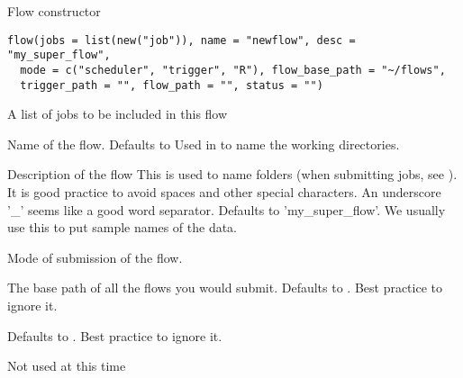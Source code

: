%
\begin{Description}\relax
Flow constructor
\end{Description}
%
\begin{Usage}
\begin{verbatim}
flow(jobs = list(new("job")), name = "newflow", desc = "my_super_flow",
  mode = c("scheduler", "trigger", "R"), flow_base_path = "~/flows",
  trigger_path = "", flow_path = "", status = "")
\end{verbatim}
\end{Usage}
%
\begin{Arguments}
\begin{ldescription}
\item[\code{jobs}]  A list of jobs to be included in this flow

\item[\code{name}]  Name of the flow. Defaults to 
Used in  to name the working directories.

\item[\code{desc}]  Description of the flow
This is used to name folders (when submitting jobs, see ).
It is good practice to avoid spaces and other special characters.
An underscore '\_' seems like a good word separator.
Defaults to 'my\_super\_flow'. We usually use this to put sample names of the data.

\item[\code{mode}]  Mode of submission of the flow.

\item[\code{flow\_base\_path}] The base path of all the flows you would submit.
Defaults to . Best practice to ignore it.

\item[\code{trigger\_path}] 
Defaults to . Best practice to ignore it.

\item[\code{flow\_path}] 

\item[\code{status}]  Not used at this time
\end{ldescription}
\end{Arguments}
